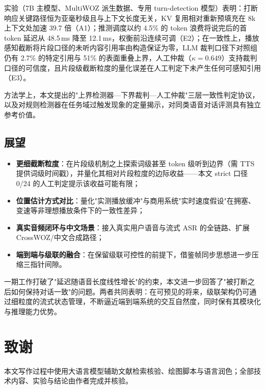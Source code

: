 \documentclass[conference]{IEEEtran}
\theoremstyle{definition}
\begin{document}
实验（7B 主模型、MultiWOZ 派生数据、专用 turn-detection 模型）表明：打断响应关键路径恒为亚毫秒级且与上下文长度无关，KV 复用相对重新预填充在 8k 上下文处加速 39.7 倍（A1）；推测调度以约 4.5\% 的 token 浪费将说完后的首 token 延迟从 48.5\,ms 降至 12.1\,ms，权衡前沿连续可调（E2）；在一致性上，播放感知截断将片段口径的未听内容引用率由构造保证为零，LLM 裁判口径下对照组仍有 2.7\% 的特定引用与 51\% 的表面重叠上界，人工仲裁（$\kappa=0.649$）支持裁判口径的可信度，且片段级截断粒度的量化误差在人工判定下未产生任何可感知引用（E3）。

方法学上，本文提出的"上界检测器—下界裁判—人工仲裁"三层一致性判定协议，以及对规则检测器在任务域过触发现象的定量揭示，对同类语音对话评测具有独立参考价值。

\subsection{展望}
\begin{itemize}
  \item \textbf{更细截断粒度}：在片段级机制之上探索词级甚至 token 级听到边界（需 TTS 提供词级时间戳），并量化其相对片段粒度的边际收益——本文 strict 口径 0/24 的人工判定提示该收益可能有限；
  \item \textbf{位置估计方式对比}：量化"实测播放缓冲"与商用系统"实时速度假设"在拥塞、变速等非理想播放条件下的一致性差异；
  \item \textbf{真实音频闭环与中文场景}：接入真实用户语音与流式 ASR 的全链路、扩展 CrossWOZ/中文合成路径；
  \item \textbf{端到端与级联的融合}：在保留级联可控性的前提下，借鉴帧同步思想进一步压缩三指针间隙。
\end{itemize}

一期工作打破了"延迟随语音长度线性增长"的约束，本文进一步回答了"被打断之后如何保持对话一致"的问题。两者共同表明：在可预见的将来，级联架构仍可通过细粒度的流式状态管理，不断逼近端到端系统的交互自然度，同时保有其模块化与推理能力优势。

\section*{致谢}
本文写作过程中使用大语言模型辅助文献检索核验、绘图脚本与语言润色；全部技术内容、实验与结论由作者完成并核验。



\end{document}
